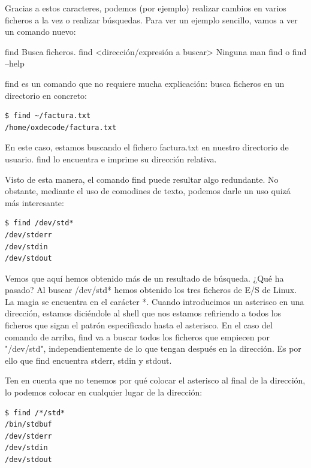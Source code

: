 Gracias a estos caracteres, podemos (por ejemplo) realizar cambios en varios ficheros a la vez o realizar búsquedas. Para ver un ejemplo sencillo, vamos a ver un comando nuevo:

\begin{command-info}
{find}
{Busca ficheros.}
{find <dirección/expresión a buscar>}
{Ninguna}
{man find o find --help}
\end{command-info}

find es un comando que no requiere mucha explicación: busca ficheros en un directorio en concreto:

\begin{tcolorbox-code}
\begin{lstlisting}
$ find ~/factura.txt
/home/oxdecode/factura.txt
\end{lstlisting}
\end{tcolorbox-code}

En este caso, estamos buscando el fichero factura.txt en nuestro directorio de usuario. find lo encuentra e imprime su dirección relativa.

Visto de esta manera, el comando find puede resultar algo redundante. No obstante, mediante el uso de comodines de texto, podemos darle un uso quizá más interesante:

\begin{tcolorbox-code}
\begin{lstlisting}
$ find /dev/std*
/dev/stderr
/dev/stdin
/dev/stdout
\end{lstlisting}
\end{tcolorbox-code}

Vemos que aquí hemos obtenido más de un resultado de búsqueda. ¿Qué ha pasado? Al buscar /dev/std* hemos obtenido los tres ficheros de E/S de Linux. La magia se encuentra en el carácter *.
Cuando introducimos un asterisco en una dirección, estamos diciéndole al shell que nos estamos refiriendo a todos los ficheros que sigan el patrón especificado hasta el asterisco. En el caso del comando de arriba, find va a buscar todos los ficheros que empiecen por "/dev/std", independientemente de lo que tengan después en la dirección. Es por ello que find encuentra stderr, stdin y stdout.

Ten en cuenta que no tenemos por qué colocar el asterisco al final de la dirección, lo podemos colocar en cualquier lugar de la dirección:

\begin{tcolorbox-code}
\begin{lstlisting}
$ find /*/std*
/bin/stdbuf
/dev/stderr
/dev/stdin
/dev/stdout
\end{lstlisting}
\end{tcolorbox-code}

